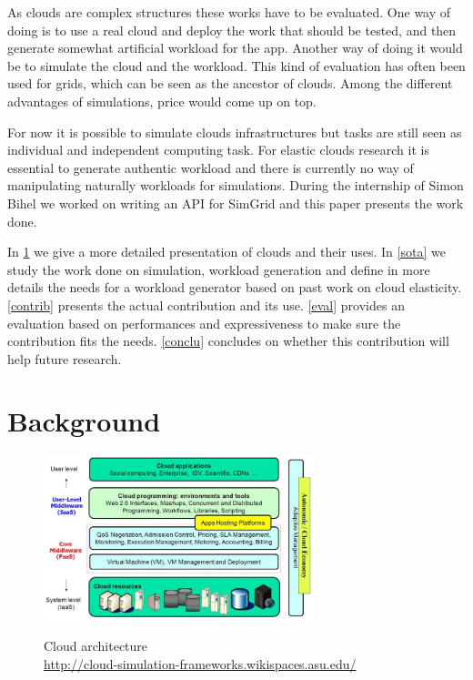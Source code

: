 \documentclass[a4paper]{IEEEtran}
\begin{document}
  As clouds are complex structures these works have to be evaluated. One way of 
  doing is to use a real cloud and deploy the work that should be tested, and 
  then generate somewhat artificial workload for the app. Another way of doing 
  it would be to simulate the cloud and the workload. This kind of evaluation 
  has often been used for grids, which can be seen as the ancestor of clouds. 
  Among the different advantages of simulations, price would come up on top. 
  
  For now it is possible to simulate clouds infrastructures but tasks are still 
  seen as individual and independent computing task. For elastic clouds 
  research it is essential to generate authentic workload and there is 
  currently no way of manipulating naturally workloads for simulations. During 
  the internship of Simon Bihel we worked on writing an API for SimGrid and this
  paper presents the work done.
  
  In \ref{background} we give a more detailed presentation of clouds and their 
  uses. In \ref{sota} we study the work done on simulation, workload generation 
  and define in more details the needs for a workload generator based on past 
  work on cloud elasticity. \ref{contrib} presents the actual contribution and 
  its use. \ref{eval} provides an evaluation based on performances and 
  expressiveness to make sure the contribution fits the needs. \ref{conclu} 
  concludes on whether this contribution will help future research.


\section{Background} \label{background}
  \begin{figure}
    \caption{Cloud architecture \\ 
    \url{http://cloud-simulation-frameworks.wikispaces.asu.edu/}}
    \centering
    \includegraphics[width=0.7\textwidth]{../plots/cloud_architecture}
    \label{cloud_arch}
  \end{figure}
  
\end{document}
